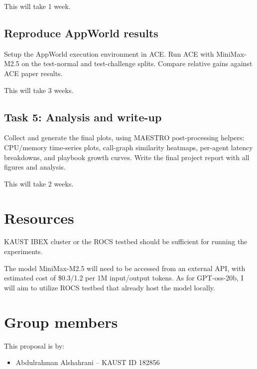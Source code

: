 \documentclass[letterpaper,twocolumn,10pt]{article}
\begin{document}
This will take 1 week.

\subsection{Reproduce AppWorld results}
Setup the AppWorld execution environment in ACE. Run ACE with MiniMax-M2.5 on the test-normal and test-challenge splits. Compare relative gains against ACE paper results.

This will take 3 weeks.

\subsection{Task 5: Analysis and write-up}
Collect and generate the final plots, using MAESTRO post-processing helpers: CPU/memory time-series plots, call-graph similarity heatmaps, per-agent latency breakdowns, and playbook growth curves. Write the final project report with all figures and analysis.

This will take 2 weeks.


\section{Resources}

KAUST IBEX cluster or the ROCS testbed should be sufficient for running the experiments.

The model MiniMax-M2.5 will need to be accessed from an external API, with estimated cost of \$0.3/1.2 per 1M input/output tokens. As for GPT-oss-20b, I will aim to utilize ROCS testbed that already host the model locally.

\section*{Group members}

This proposal is by:
\begin{itemize}
  \item Abdulrahman Alshahrani -- KAUST ID 182856
\end{itemize}




\end{document}
